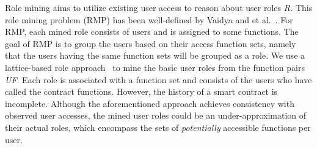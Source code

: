 Role mining aims to utilize existing user access to reason about user roles $R$.
This role mining problem (RMP) has been well-defined by Vaidya and et al.~\cite{vaidya2007role}.
For RMP, each mined role consists of users and is assigned to some functions.
The goal of RMP is to group the users based on their access function sets,
namely that the users having the same function sets will be grouped as a role.
%
We use a lattice-based role approach~\cite{molloy2008mining} to mine the basic user roles from the function pairs \textit{UF}.
Each role is associated with a function set and consists of the users who have called the contract functions.
However, the history of a smart contract is incomplete.
Although the aforementioned approach achieves consistency with observed user accesses,
the mined user roles could be an under-approximation of their actual roles,
which encompass the sets of \emph{potentially} accessible functions per user.


